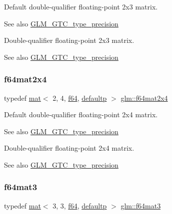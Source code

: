 Default double-\/qualifier floating-\/point 2x3 matrix. \begin{DoxySeeAlso}{See also}
\mbox{\hyperlink{group__gtc__type__precision}{G\+L\+M\+\_\+\+G\+T\+C\+\_\+type\+\_\+precision}}
\end{DoxySeeAlso}
Double-\/qualifier floating-\/point 2x3 matrix. \begin{DoxySeeAlso}{See also}
\mbox{\hyperlink{group__gtc__type__precision}{G\+L\+M\+\_\+\+G\+T\+C\+\_\+type\+\_\+precision}} 
\end{DoxySeeAlso}
\mbox{\label{group__gtc__type__precision_gae075a2083e1801ada5c99c91f79eb6ed}} 
\subsubsection{\texorpdfstring{f64mat2x4}{f64mat2x4}}
{\footnotesize\ttfamily typedef \mbox{\hyperlink{structglm_1_1mat}{mat}}$<$ 2, 4, \mbox{\hyperlink{group__gtc__type__precision_ga2bba392e555124b36cde6abba349bab3}{f64}}, \mbox{\hyperlink{namespaceglm_a36ed105b07c7746804d7fdc7cc90ff25a9d21ccd8b5a009ec7eb7677befc3bf51}{defaultp}} $>$ \mbox{\hyperlink{group__gtc__type__precision_gae075a2083e1801ada5c99c91f79eb6ed}{glm\+::f64mat2x4}}}

Default double-\/qualifier floating-\/point 2x4 matrix. \begin{DoxySeeAlso}{See also}
\mbox{\hyperlink{group__gtc__type__precision}{G\+L\+M\+\_\+\+G\+T\+C\+\_\+type\+\_\+precision}}
\end{DoxySeeAlso}
Double-\/qualifier floating-\/point 2x4 matrix. \begin{DoxySeeAlso}{See also}
\mbox{\hyperlink{group__gtc__type__precision}{G\+L\+M\+\_\+\+G\+T\+C\+\_\+type\+\_\+precision}} 
\end{DoxySeeAlso}
\mbox{\label{group__gtc__type__precision_ga44a41778554076393a2c59a98fe5128e}} 
\subsubsection{\texorpdfstring{f64mat3}{f64mat3}}
{\footnotesize\ttfamily typedef \mbox{\hyperlink{structglm_1_1mat}{mat}}$<$ 3, 3, \mbox{\hyperlink{group__gtc__type__precision_ga2bba392e555124b36cde6abba349bab3}{f64}}, \mbox{\hyperlink{namespaceglm_a36ed105b07c7746804d7fdc7cc90ff25a9d21ccd8b5a009ec7eb7677befc3bf51}{defaultp}} $>$ \mbox{\hyperlink{group__gtc__type__precision_ga44a41778554076393a2c59a98fe5128e}{glm\+::f64mat3}}}

